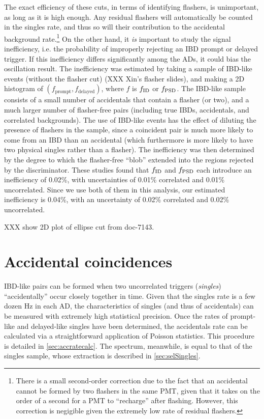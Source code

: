 \documentclass[../thesis.tex]{subfiles}
\begin{document}
The exact efficiency of these cuts, in terms of identifying flashers, is unimportant, as long as it is high enough. Any residual flashers will automatically be counted in the singles rate, and thus so will their contribution to the accidental background rate.\footnote{There is a small second-order correction due to the fact that an accidental cannot be formed by two flashers in the same PMT, given that it takes on the order of a second for a PMT to ``recharge'' after flashing. However, this correction is negigible given the extremely low rate of residual flashers.} On the other hand, it \emph{is} important to study the signal inefficiency, i.e. the probability of improperly rejecting an IBD prompt or delayed trigger. If this inefficiency differs significantly among the ADs, it could bias the oscillation result. The inefficiency was estimated by taking a sample of IBD-like events (without the flasher cut) (XXX Xin's flasher slides), and making a 2D histogram of $(f_{\mathrm{prompt}},f_{\mathrm{delayed}})$, where $f$ is $f_{\mathrm{ID}}$ or $f_{\mathrm{PSD}}$. The IBD-like sample consists of a small number of accidentals that contain a flasher (or two), and a much larger number of flasher-free pairs (including true IBDs, accidentals, and correlated backgrounds). The use of IBD-like events has the effect of diluting the presence of flashers in the sample, since a coincident pair is much more likely to come from an IBD than an accidental (which furthermore is more likely to have two physical singles rather than a flasher). The inefficiency was then determined by the degree to which the flasher-free ``blob'' extended into the regions rejected by the discriminator. These studies found that $f_{\mathrm{ID}}$ and $f_{\mathrm{PSD}}$ each introduce an inefficiency of 0.02\%, with uncertainties of 0.01\% correlated and 0.01\% uncorrelated. Since we use both of them in this analysis, our estimated inefficiency is 0.04\%, with an uncertainty of 0.02\% correlated and 0.02\% uncorrelated.

XXX show 2D plot of ellipse cut from doc-7143.

\section{Accidental coincidences}
\label{sec:accbkg}

IBD-like pairs can be formed when two uncorrelated triggers (\emph{singles}) ``accidentally'' occur closely together in time. Given that the singles rate is a few dozen Hz in each AD, the characteristics of singles (and thus of accidentals) can be measured with extremely high statistical precision. Once the rates of prompt-like and delayed-like singles have been determined, the accidentals rate can be calculated via a straightforward application of Poisson statistics. This procedure is detailed in \autoref{sec:accratecalc}. The spectrum, meanwhile, is equal to that of the singles sample, whose extraction is described in \autoref{sec:selSingles}.
\end{document}
